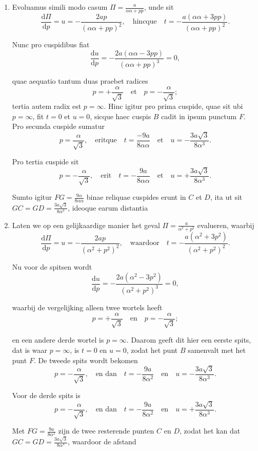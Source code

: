 \documentclass[10pt,a4paper]{article}
\newcommand{\switchenum}{\setcounter{enumi}{\arabic{enumi}-1}\switchcolumn}
\def\D{\mathrm{d}}
\begin{document}
\begin{paracol}{2}
\begin{enumerate}[topsep=1px]
		\item Evoluamus simili modo casum $\Pi = \frac{a}{\alpha\alpha + pp}$, unde sit
		\[
			\frac{\D \Pi}{\D p} = u = -\frac{2a p}{(\alpha \alpha + pp)^2}, \quad \text{hincque}\quad t = -\frac{a(\alpha \alpha+ 3pp)}{(\alpha \alpha +pp)^2}.
		\]
		\par Nunc pro cuspidibus fiat
		\[
			\frac{\D u}{ \D p} = -\frac{2a(\alpha\alpha- 3pp)}{(\alpha\alpha+ pp)^3} = 0,
		\]
		\par quae aequatio tantum duas praebet radices
		\[
			p = +\frac{\alpha}{\sqrt{3}} \quad \text{et} \quad p = -\frac{\alpha}{\sqrt{3}};
		\]
		tertia autem radix est $p=\infty$. Hinc igitur pro prima cuspide, quae sit ubi $p=\infty$, fit $t=0$ et $u=0$, sicque haec cuspis $B$ cadit in ipsum punctum $F$. Pro secunda cuspide sumatur
		\[
			p = \frac{\alpha}{\sqrt{3}}, \quad \text{eritque}\quad t = \frac{-9a}{8\alpha \alpha} \quad \text{et} \quad u=-\frac{3a \sqrt{3}}{8\alpha^3}.
		\]
		\par Pro tertia cuspide sit
		\[
			p = -\frac{\alpha}{\sqrt{3}}, \quad \text{erit} \quad t = -\frac{9a}{8\alpha \alpha} \quad \text{et} \quad u=+\frac{3a \sqrt{3}}{8\alpha^3}.
		\]
		\par Sumto igitur $FG = \frac{9\alpha}{8\alpha \alpha}$ binae reliquae cuspides erunt in $C$ et $D$, ita ut sit $GC = GD = \frac{3a \sqrt{3}}{8\alpha^3}$, ideoque earum distantia
		
		\switchenum
		\item Laten we op een gelijkaardige manier het geval $\Pi = \frac{a}{\alpha^2 + p^2}$ evalueren, waarbij
		\[
			\frac{\D \Pi}{\D p} = u = -\frac{2a p}{(\alpha^2 + p^2)^2}, \quad \text{waardoor}\quad t = -\frac{a(\alpha^2+ 3p^2)}{(\alpha^2 +p^2)^2}.
		\]
		\par Nu voor de spitsen wordt
		\[
			\frac{\D u}{ \D p} = -\frac{2a(\alpha^2- 3p^2)}{(\alpha^2+ p^2)^3} = 0,
		\]
		\par waarbij de vergelijking alleen twee wortels heeft
		\[
			p = +\frac{\alpha}{\sqrt{3}} \quad \text{en} \quad p = -\frac{\alpha}{\sqrt{3}};
		\]
		\par en een andere derde wortel is $p=\infty$. Daarom geeft dit hier een eerste spits, dat is waar $p=\infty$, is $t=0$ en $u=0$, zodat het punt $B$ samenvalt met het punt $F$. De tweede spits wordt bekomen
		\[
			p = -\frac{\alpha}{\sqrt{3}}, \quad \text{en dan} \quad t = -\frac{9a}{8\alpha^2} \quad \text{en} \quad u=-\frac{3a \sqrt{3}}{8\alpha^3}.
		\]
		\par Voor de derde spits is
		\[
			p = -\frac{\alpha}{\sqrt{3}}, \quad \text{en dan} \quad t = -\frac{9a}{8\alpha^2} \quad \text{en} \quad u=+\frac{3a \sqrt{3}}{8\alpha^3}.
		\]
		\par Met $FG = \frac{9a}{8\alpha^2}$ zijn de twee resterende punten $C$ en $D$, zodat het kan dat $GC=GD=\frac{3a\sqrt{3}}{8\alpha^3}$, waardoor de afstand
		

\end{enumerate}
\end{paracol}
\end{document}
